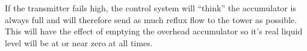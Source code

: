 





 






If the transmitter fails high, the control system will ``think'' the accumulator is always full and will therefore send as much reflux flow to the tower as possible.  This will have the effect of emptying the overhead accumulator so it's real liquid level will be at or near zero at all times.




